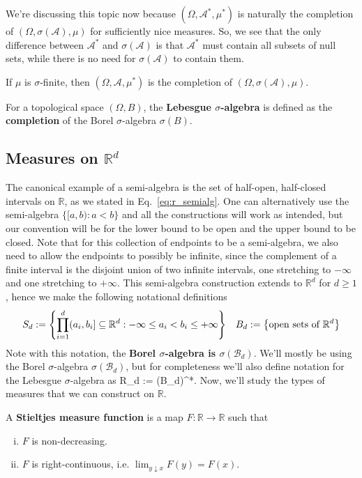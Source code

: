 We're discussing this topic now because $(\Omega, \mathcal A^*, \mu^*)$ is naturally the completion of $(\Omega, \sigma(\mathcal A), \mu)$ for sufficiently nice measures. So, we see that the only difference between $\mathcal A^*$ and $\sigma(\mathcal A)$ is that $\mathcal A^*$ must contain all subsets of null sets, while there is no need for $\sigma(\mathcal A)$ to contain them. 

\begin{theorem}
	If $\mu$ is $\sigma$-finite, then $(\Omega, \mathcal A, \mu^*)$ is the completion of $(\Omega, \sigma(\mathcal A), \mu)$. 
\end{theorem}

\begin{definition}
	For a topological space $(\Omega, B)$, the \textbf{Lebesgue $\sigma$-algebra} is defined as the \textbf{completion} of the Borel $\sigma$-algebra $\sigma(B)$. 
\end{definition}


\subsection{Measures on $\mathbb R^d$}

The canonical example of a semi-algebra is the set of half-open, half-closed intervals on $\mathbb R$, as we stated in Eq.~\eqref{eq:r_semialg}. One can alternatively use the semi-algebra $\{[a, b) : a < b\}$ and all the constructions will work as intended, but our convention will be for the lower bound to be open and the upper bound to be closed. Note that for this collection of endpoints to be a semi-algebra, we also need to allow the endpoints to possibly be infinite, since the complement of a finite interval is the disjoint union of two infinite intervals, one stretching to $-\infty$ and one stretching to $+\infty$. This semi-algebra construction extends to $\mathbb R^d$ for $d\geq 1$, hence we make the following notational definitions
\begin{align}
	S_d := \left\{\prod_{i = 1}^d (a_i, b_i] \subseteq\mathbb R^d : -\infty \leq a_i < b_i\leq +\infty \right\} && B_d := \left\{\textnormal{open sets of } \mathbb R^d \right\}
\end{align}
Note with this notation, the \textbf{Borel $\sigma$-algebra is $\sigma(\mathcal B_d)$}. We'll mostly be using the Borel $\sigma$-algebra $\sigma(\mathcal B_d)$, but for completeness we'll also define notation for the Lebesgue $\sigma$-algebra as
\eq
	\mathcal R_d := \sigma(\mathcal B_d)^*.
\qe
Now, we'll study the types of measures that we can construct on $\mathbb R$.
\begin{definition} \label{def:stieltjes_measure_fn}
	A \textbf{Stieltjes measure function} is a map $F : \mathbb R\rightarrow\mathbb R$ such that
	\begin{enumerate}[i)]
		\item $F$ is non-decreasing. 
		\item $F$ is right-continuous, i.e. $\lim_{y\downarrow x} F(y) = F(x)$. 
	\end{enumerate}
\end{definition}

